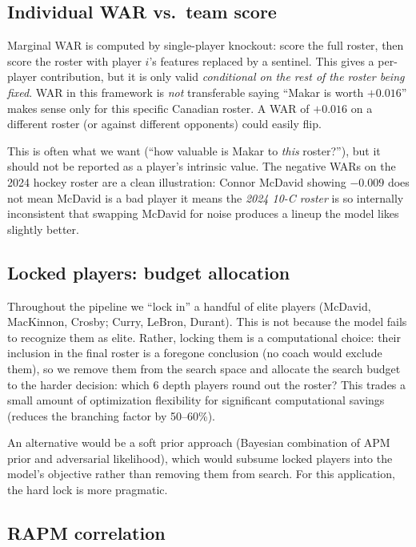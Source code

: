 \documentclass[11pt,letterpaper]{article}
\begin{document}
\subsection{Individual WAR vs.\ team score}

Marginal WAR is computed by single-player knockout: score the full
roster, then score the roster with player $i$'s features replaced by
a sentinel. This gives a per-player contribution, but it is only
valid \emph{conditional on the rest of the roster being fixed}. WAR
in this framework is \emph{not} transferable saying ``Makar is
worth $+0.016$'' makes sense only for this specific Canadian roster.
A WAR of $+0.016$ on a different roster (or against different
opponents) could easily flip.

This is often what we want (``how valuable is Makar to \emph{this}
roster?''), but it should not be reported as a player's intrinsic
value. The negative WARs on the 2024 hockey roster are a clean
illustration: Connor McDavid showing $-0.009$ does not mean McDavid
is a bad player it means the \emph{2024 10-C roster} is so
internally inconsistent that swapping McDavid for noise produces a
lineup the model likes slightly better.

\subsection{Locked players: budget allocation}

Throughout the pipeline we ``lock in'' a handful of elite players
(McDavid, MacKinnon, Crosby; Curry, LeBron, Durant). This is not
because the model fails to recognize them as elite. Rather, locking them
is a computational choice: their inclusion in the final roster is a
foregone conclusion (no coach would exclude them), so we remove them
from the search space and allocate the search budget to the harder
decision: which 6 depth players round out the roster? This trades a
small amount of optimization flexibility for significant computational
savings (reduces the branching factor by 50--60\%).

An alternative would be a soft prior approach (Bayesian combination of
APM prior and adversarial likelihood), which would subsume locked
players into the model's objective rather than removing them from
search. For this application, the hard lock is more pragmatic.

\subsection{RAPM correlation}
\label{sec:rapm}
\end{document}
